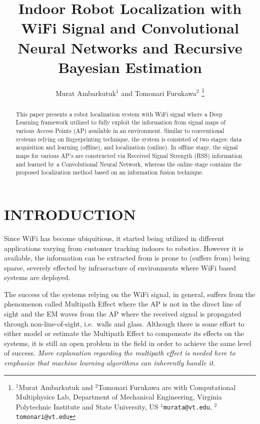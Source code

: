 \documentclass[letterpaper, 10 pt, conference]{ieeeconf}  %
\title{\LARGE \bf
Indoor Robot Localization with WiFi Signal and Convolutional Neural Networks and Recursive Bayesian Estimation
}
\author{Murat Ambarkutuk$^{1}$ and Tomonari Furukawa$^{2}$%
\thanks{$^{1}$Murat Ambarkutuk and $^{2}$Tomonari Furukawa are with Computational Multiphysics Lab, Department of Mechanical Engineering,
        Virginia Polytechnic Institute and State University, US
        {\tt\small $^{1}$murata@vt.edu}, {\tt\small $^{2}$tomonari@vt.edu}}%
}
\begin{document}
\maketitle
\thispagestyle{empty}
\pagestyle{empty}


\begin{abstract}

  This paper presents a robot localization system with WiFi signal where a Deep Learning framework utilized to fully exploit the information from signal maps of various Access Points (AP) available in an environment.
  Similar to conventional systems relying on fingerprinting technique, the system is consisted of two stages: data acquisition and learning (offline), and localization (online).
  In offline stage, the signal maps for various AP's are constructed via Received Signal Strength (RSS) information and learned by a Convolutional Neural Network, whereas the online stage contains the proposed localization method based on an information fusion technique.

\end{abstract}


\section{INTRODUCTION}
Since WiFi has become ubiquitious, it started being utilized in different applications varying from customer tracking indoors to robotics. %
However it is available, the information can be extracted from is prone to (suffers from) being sparse, severely effected by infrasracture of environments where WiFi based systems are deployed.

The success of the systems relying on the WiFi signal, in general, suffers from the phenomenon called Multipath Effect where the AP is not in the direct line of sight and the EM waves from the AP where the received signal is propagated through non-line-of-sight, i.e.~walls and glass.
Although there is some effort to either model or estimate the Multipath Effect to componsate its effects on the systems, it is still an open problem in the field in order to achieve the same level of success.
\textit{More explanation regarding the multipath effect is needed here to emphasize that machine learning algorithms can inherently handle it.}
\end{document}
